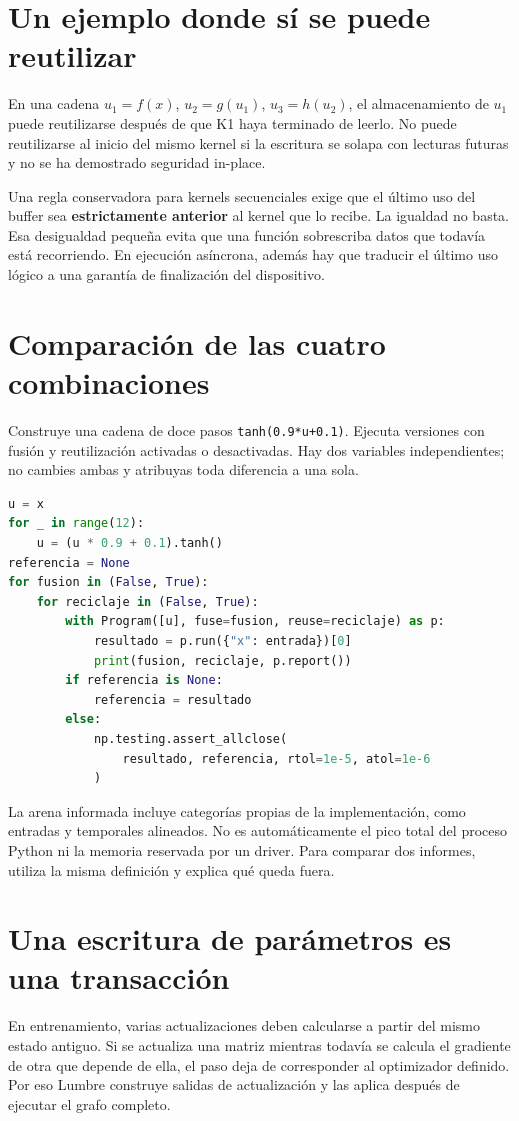 \documentclass[12pt,a4paper,oneside]{report}
\begin{document}
\section{Un ejemplo donde sí se puede reutilizar}
En una cadena $u_1=f(x)$, $u_2=g(u_1)$, $u_3=h(u_2)$, el almacenamiento de $u_1$ puede reutilizarse después de que K1 haya terminado de leerlo. No puede reutilizarse al inicio del mismo kernel si la escritura se solapa con lecturas futuras y no se ha demostrado seguridad in-place.

Una regla conservadora para kernels secuenciales exige que el último uso del buffer sea \textbf{estrictamente anterior} al kernel que lo recibe. La igualdad no basta. Esa desigualdad pequeña evita que una función sobrescriba datos que todavía está recorriendo. En ejecución asíncrona, además hay que traducir el último uso lógico a una garantía de finalización del dispositivo.

\section{Comparación de las cuatro combinaciones}
Construye una cadena de doce pasos \texttt{tanh(0.9*u+0.1)}. Ejecuta versiones con fusión y reutilización activadas o desactivadas. Hay dos variables independientes; no cambies ambas y atribuyas toda diferencia a una sola.

\begin{lstlisting}[language=Python]
u = x
for _ in range(12):
    u = (u * 0.9 + 0.1).tanh()
referencia = None
for fusion in (False, True):
    for reciclaje in (False, True):
        with Program([u], fuse=fusion, reuse=reciclaje) as p:
            resultado = p.run({"x": entrada})[0]
            print(fusion, reciclaje, p.report())
        if referencia is None:
            referencia = resultado
        else:
            np.testing.assert_allclose(
                resultado, referencia, rtol=1e-5, atol=1e-6
            )
\end{lstlisting}
La arena informada incluye categorías propias de la implementación, como entradas y temporales alineados. No es automáticamente el pico total del proceso Python ni la memoria reservada por un driver. Para comparar dos informes, utiliza la misma definición y explica qué queda fuera.

\section{Una escritura de parámetros es una transacción}
En entrenamiento, varias actualizaciones deben calcularse a partir del mismo estado antiguo. Si se actualiza una matriz mientras todavía se calcula el gradiente de otra que depende de ella, el paso deja de corresponder al optimizador definido. Por eso Lumbre construye salidas de actualización y las aplica después de ejecutar el grafo completo.
\end{document}
